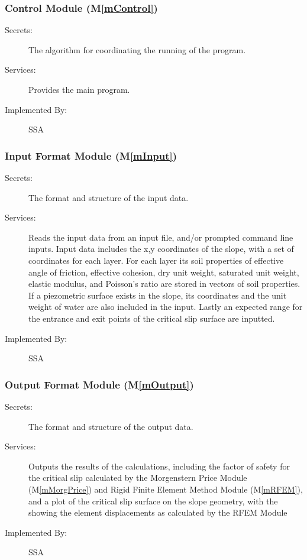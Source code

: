 \documentclass[12pt]{article}
\newcommand{\mref}[1]{M\ref{#1}}
\newcommand{\progname}[1]{SSA}
\begin{document}
\subsubsection{Control Module (\mref{mControl})}

\begin{description}
\item[Secrets:] The algorithm for coordinating the running of the
  program.
\item[Services:] Provides the main program.
\item[Implemented By:] \progname{}
\end{description}


\subsubsection{Input Format Module (\mref{mInput})}

\begin{description}
\item[Secrets:]The format and structure of the input data.
\item[Services:] Reads the input data from an input file, and/or
  prompted command line inputs. Input data includes the x,y
  coordinates of the slope, with a set of coordinates for each
  layer. For each layer its soil properties of effective angle of
  friction, effective cohesion, dry unit weight, saturated unit
  weight, elastic modulus, and Poisson's ratio are stored in vectors
  of soil properties. If a piezometric surface exists in the slope,
  its coordinates and the unit weight of water are also included in
  the input. Lastly an expected range for the entrance and exit points
  of the critical slip surface are inputted.
\item[Implemented By:] \progname{}
\end{description}

\subsubsection{Output Format Module (\mref{mOutput})}

\begin{description}
\item[Secrets:] The format and structure of the output data.
\item[Services:] Outputs the results of the calculations, including
  the factor of safety for the critical slip calculated by the
  Morgenstern Price Module (\mref{mMorgPrice}) and Rigid Finite
  Element Method Module (\mref{mRFEM}), and a plot of the critical
  slip surface on the slope geometry, with the showing the element
  displacements as calculated by the RFEM Module
\item[Implemented By:] \progname{}
\end{description} 
\end{document}
